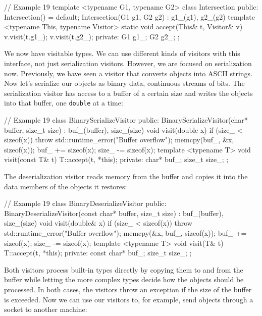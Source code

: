 \begin{code}
// Example 19
template <typename G1, typename G2>
class Intersection {
  public:
  Intersection() = default;
  Intersection(G1 g1, G2 g2) : g1_(g1), g2_(g2) {}
  template <typename This, typename Visitor>
  static void accept(This& t, Visitor& v) {
    v.visit(t.g1_);
    v.visit(t.g2_);
  }
  private:
  G1 g1_;
  G2 g2_;
};
\end{code}

We now have visitable types. We can use different kinds of visitors with this interface, not just serialization visitors. However, we are focused on serialization now. Previously, we have seen a visitor that converts objects into ASCII strings. Now let's serialize our objects as binary data, continuous streams of bits. The serialization visitor has access to a buffer of a certain size and writes the objects into that buffer, one \texttt{double} at a time:

\begin{code}
// Example 19
class BinarySerializeVisitor {
  public:
  BinarySerializeVisitor(char* buffer, size_t size) :
    buf_(buffer), size_(size) {}
  void visit(double x) {
    if (size_ < sizeof(x))
      throw std::runtime_error("Buffer overflow");
    memcpy(buf_, &x, sizeof(x));
    buf_ += sizeof(x);
    size_ -= sizeof(x);
  }
  template <typename T> void visit(const T& t) {
    T::accept(t, *this);
  }
  private:
  char* buf_;
  size_t size_;
};
\end{code}

The deserialization visitor reads memory from the buffer and copies it into the data members of the objects it restores:

\begin{code}
// Example 19
class BinaryDeserializeVisitor {
  public:
  BinaryDeserializeVisitor(const char* buffer, size_t size)
    : buf_(buffer), size_(size) {}
  void visit(double& x) {
    if (size_ < sizeof(x))
      throw std::runtime_error("Buffer overflow");
    memcpy(&x, buf_, sizeof(x));
    buf_ += sizeof(x);
    size_ -= sizeof(x);
  }
  template <typename T> void visit(T& t) {
    T::accept(t, *this);
  }
  private:
  const char* buf_;
  size_t size_;
};
\end{code}

Both visitors process built-in types directly by copying them to and from the buffer while letting the more complex types decide how the objects should be processed. In both cases, the visitors throw an exception if the size of the buffer is exceeded. Now we can use our visitors to, for example, send objects through a socket to another machine:

